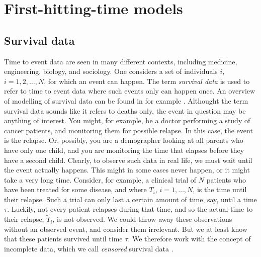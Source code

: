 \chapter{First-hitting-time models}
\label{chap:fht-surv}
\section{Survival data}
Time to event data are seen in many different contexts, including medicine, engineering, biology, and sociology.
One considers a set of individuals $i$, $i=1,2,\ldots,N$, for which an event can happen.
The term \textit{survival data} is used to refer to time to event data where such events only can happen once.
An overview of modelling of survival data can be found in for example \citet{ABG}.
Althought the term survival data sounds like it refers to deaths only, the event in question may be anything of interest.
You might, for example, be a doctor performing a study of cancer patients, and monitoring them for possible relapse.
In this case, the event is the relapse.
Or, possibly, you are a demographer looking at all parents who have only one child, and you are monitoring the time that elapses before they have a second child.
Clearly, to observe such data in real life, we must wait until the event actually happens.
This might in some cases never happen, or it might take a very long time.
Consider, for example, a clinical trial of $N$ patients who have been treated for some disease, and where $T_i$, $i=1,\ldots,N$, is the time until their relapse.
Such a trial can only last a certain amount of time, say, until a time $\tau$.
Luckily, not every patient relapses during that time, and so the actual time to their relapse, $\tilde{T}_i$, is not observed.
We could throw away these observations without an observed event, and consider them irrelevant.
But we at least know that these patients survived until time $\tau$.
We therefore work with the concept of incomplete data, which we call \textit{censored} survival data \citep{ABG}.


